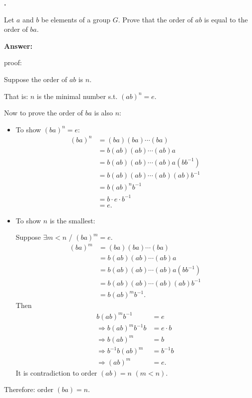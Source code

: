 \documentclass[11pt]{article}
\newcounter{ej}
\renewcommand{\theej}{\textbf{\arabic{ej}.}}
\newenvironment{ej}{
    \stepcounter{ej}
    \begin{list}{\theej}{
        \setlength{\itemindent}{0ex}
        \setlength{\labelwidth}{4ex}
        \setlength{\labelsep}{0.5ex}
        \setlength{\leftmargin}{4ex}
        \setlength{\listparindent}{0ex}
        \setlength{\topsep}{3mm plus 0.5mm minus 0.5mm}
        \setlength{\parsep}{0mm}
        \setlength{\itemsep}{1mm plus 0.3mm minus 0.3mm}
        \setlength{\rightmargin}{0ex}
    }
    \item
}{\end{list}}
\newenvironment{sol}{
    \def\FrameCommand##1{\fcolorbox{black}{gray!20}{##1}}%
    \MakeFramed{\advance\hsize-\width \FrameRestore}%
    \noindent\textbf{Answer:} \ignorespaces
}{\endMakeFramed}
\begin{document}
    \begin{ej}
        Let $a$ and $b$ be elements of a group $G$. Prove that the order of
        $ab$ is equal to the order of $ba$.

        \begin{sol}
            proof:

            Suppose the order of $ab$ is $n$.

            That is: $n$ is the minimal number s.t. $(ab)^n=e$.

            Now to prove the order of $ba$ is also $n$:

            \begin{itemize}
                \item To show $(ba)^n=e$:
                \begin{align*}
                    (ba)^n
                        &= (ba)(ba)\cdots(ba)\\
                        &= b(ab)(ab)\cdots(ab)a\\
                        &= b(ab)(ab)\cdots(ab)a(bb^{-1})\\
                        &= b(ab)(ab)\cdots(ab)(ab)b^{-1}\\
                        &= b(ab)^n b^{-1}\\
                        &= b\cdot e\cdot b^{-1}\\
                        &=e.
                \end{align*}

                \item To show $n$ is the smallest:

                Suppose $\exists m<n$ / $(ba)^m=e$.
                \begin{align*}
                    (ba)^m
                        &= (ba)(ba)\cdots(ba)\\
                        &= b(ab)(ab)\cdots(ab)a\\
                        &= b(ab)(ab)\cdots(ab)a(bb^{-1})\\
                        &= b(ab)(ab)\cdots(ab)(ab)b^{-1}\\
                        &= b(ab)^m b^{-1}.
                \end{align*}
                Then
                \begin{align*}
                    b(ab)^m b^{-1}&=e\\
                    \Rightarrow b(ab)^m b^{-1}b&=e\cdot b\\
                    \Rightarrow b(ab)^m&=b\\
                    \Rightarrow b^{-1}b(ab)^m&=b^{-1}b\\
                    \Rightarrow (ab)^m&=e.
                \end{align*}
                It is contradiction to order $(ab)=n$ $(m<n)$.
            \end{itemize}

            Therefore: order $(ba)=n$.
        \end{sol}
    \end{ej}
\end{document}
